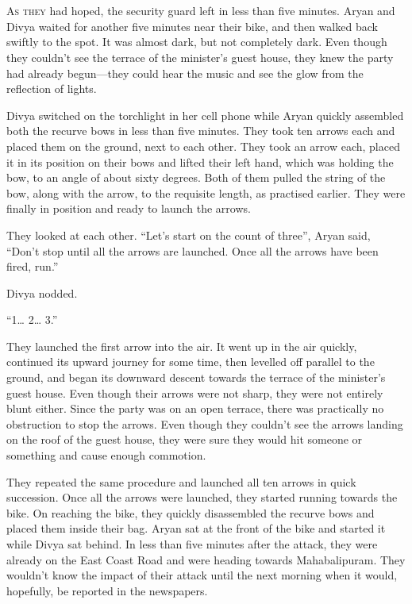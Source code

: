 \chapter{}

\lettrine{A}{s they} had hoped, the security guard left in less than five minutes.
Aryan and Divya waited for another five minutes near their bike, and then walked
back swiftly to the spot. It was almost dark, but not completely dark. Even though they couldn't see the terrace of the minister's guest house, they knew the party had already
begun—they could hear the music and see the glow from the reflection of
lights.

Divya switched on the torchlight in her cell phone while Aryan quickly
assembled both the recurve bows in less than five minutes. They took ten arrows
each and placed them on the ground, next to each other. They took an arrow each,
placed it in its position on their bows and lifted their left hand, which was
holding the bow, to an angle of about sixty degrees. Both of them pulled the
string of the bow, along with the arrow, to the requisite length, as practised
earlier. They were finally in position and ready to launch the arrows.

They looked at each other. “Let's start on the count of three”, Aryan said,
“Don't stop until all the arrows are launched. Once all the arrows have been
fired, run.”

Divya nodded.

“1… 2… 3.”

They launched the first arrow into the air. It went up in the air quickly,
continued its upward journey for some time, then levelled off parallel to the ground,
and began its downward descent towards the terrace of the minister's guest
house. Even though their arrows were not sharp, they were not entirely blunt
either. Since the party was on an open terrace, there was practically no
obstruction to stop the arrows. Even though they couldn't see the arrows landing
on the roof of the guest house, they were sure they would hit someone or something
and cause enough commotion.

They repeated the same procedure and launched all ten arrows in quick
succession. Once all the arrows were launched, they started running towards the
bike. On reaching the bike, they quickly disassembled the recurve bows and
placed them inside their bag. Aryan sat at the front of the bike and started it
while Divya sat behind. In less than five minutes after the attack, they were
already on the East Coast Road and were heading towards Mahabalipuram. They
wouldn't know the impact of their attack until the next morning when it
would, hopefully, be reported in the newspapers.


